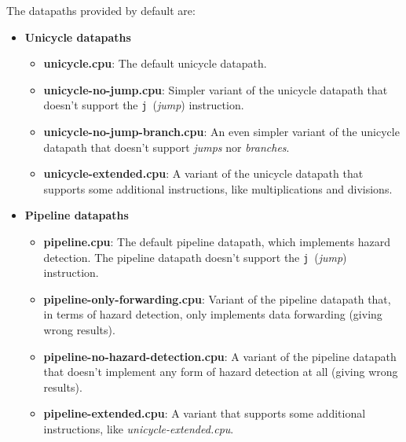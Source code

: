 \documentclass[11pt,a4paper,twoside,titlepage]{article}
\begin{document}
The datapaths provided by default are:
\begin{itemize}
	\item \textbf{Unicycle datapaths}
	\begin{itemize}
		\item \textbf{unicycle.cpu}: The default unicycle datapath.
		\item \textbf{unicycle-no-jump.cpu}: Simpler variant of the unicycle 
			datapath that doesn't support the \verb+j+~(\emph{jump}) 
			instruction.
		\item \textbf{unicycle-no-jump-branch.cpu}: An even simpler variant 
			of the unicycle datapath that doesn't support \emph{jumps} nor
			\emph{branches}.
		\item \textbf{unicycle-extended.cpu}: A variant of the unicycle 
			datapath that supports some additional instructions, like 
			multiplications and divisions.
	\end{itemize}
	
	\item \textbf{Pipeline datapaths}
	\begin{itemize}
		\item \textbf{pipeline.cpu}: The default pipeline datapath, which
			implements hazard detection. The pipeline datapath doesn't
			support the \verb+j+~(\emph{jump}) instruction.
		\item \textbf{pipeline-only-forwarding.cpu}: Variant of the pipeline
			datapath that, in terms of hazard detection, only implements
			data forwarding (giving wrong results).
		\item \textbf{pipeline-no-hazard-detection.cpu}: A variant of the
			pipeline datapath that doesn't implement any form of hazard 
			detection at all (giving wrong results).
		\item \textbf{pipeline-extended.cpu}: A variant that supports some
			additional instructions, like \emph{unicycle-extended.cpu}.
	\end{itemize}
\end{itemize}
\end{document}
